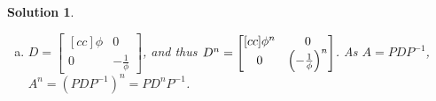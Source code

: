 \documentclass[11pt]{scrartcl}
\theoremstyle{dotlessP}
\newtheorem{sol}{Solution}[section]
\theoremstyle{dotlessN}
\DeclarePairedDelimiter\paren{(}{)} %
\begin{document}
\begin{sol}
\begin{enumerate}[(a)]
\[\begin{bmatrix}[cc]
				\phi &	-\frac{1}{\phi} \\
						1 & 1
			\end{bmatrix} \quad
			D = 
			\begin{bmatrix}
				\phi & 0 \\
				0 & -\frac{1}{\phi}
			\end{bmatrix}
			\] 
		\item $D = 
			\begin{bmatrix}[cc]
	\phi & 0 \\
	0 & -\frac{1}{\phi}
\end{bmatrix}
			$, and thus $D^n = 
			\begin{bmatrix}[cc]
	\phi^n & 0 \\
	0 & \paren*{-\frac{1}{\phi}}^n
\end{bmatrix}
$. As $A = PDP^{-1}$, $A^n = (PDP^{-1})^n = PD^nP^{-1}$.


\end{enumerate}
\end{sol}
\end{document}
